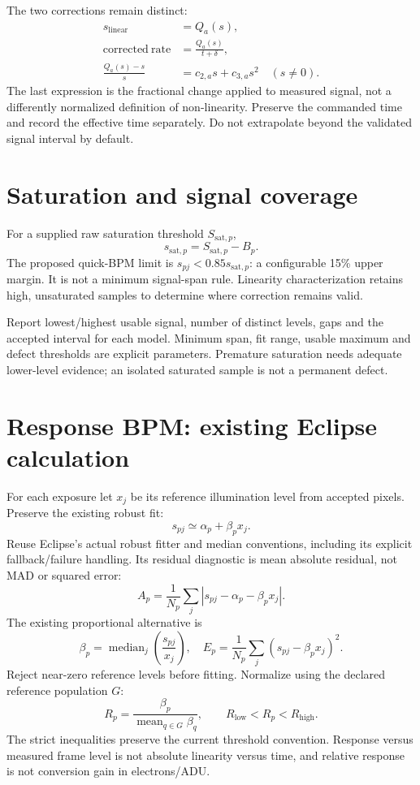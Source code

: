 \documentclass[11pt,a4paper]{article}
\newcommand{\nextpage}{\clearpage}
\begin{document}
The two corrections remain distinct:
\begin{align}
s_{\mathrm{linear}}&=Q_a(s),\\
\mathrm{corrected\ rate}&=\frac{Q_a(s)}{t+\delta},\\
\frac{Q_a(s)-s}{s}&=c_{2,a}s+c_{3,a}s^2\quad(s\ne0).
\end{align}
The last expression is the fractional change applied to measured signal, not a differently normalized definition of non-linearity. Preserve the commanded time and record the effective time separately. Do not extrapolate beyond the validated signal interval by default.

\section{Saturation and signal coverage}
For a supplied raw saturation threshold $S_{\mathrm{sat},p}$,
\begin{equation}s_{\mathrm{sat},p}=S_{\mathrm{sat},p}-B_p.
\end{equation}
The proposed quick-BPM limit is $s_{pj}<0.85s_{\mathrm{sat},p}$: a configurable 15\% upper margin. It is not a minimum signal-span rule. Linearity characterization retains high, unsaturated samples to determine where correction remains valid.

Report lowest/highest usable signal, number of distinct levels, gaps and the accepted interval for each model. Minimum span, fit range, usable maximum and defect thresholds are explicit parameters. Premature saturation needs adequate lower-level evidence; an isolated saturated sample is not a permanent defect.

\nextpage
\section{Response BPM: existing Eclipse calculation}
For each exposure let $x_j$ be its reference illumination level from accepted pixels. Preserve the existing robust fit:
\begin{equation}s_{pj}\simeq\alpha_p+\beta_px_j.
\end{equation}
Reuse Eclipse's actual robust fitter and median conventions, including its explicit fallback/failure handling. Its residual diagnostic is mean absolute residual, not MAD or squared error:
\begin{equation}A_p=\frac{1}{N_p}\sum_j|s_{pj}-\alpha_p-\beta_px_j|.
\end{equation}
The existing proportional alternative is
\begin{equation}\beta_p=\operatorname{median}_j\left(\frac{s_{pj}}{x_j}\right),\quad
E_p=\frac{1}{N_p}\sum_j(s_{pj}-\beta_px_j)^2.
\end{equation}
Reject near-zero reference levels before fitting. Normalize using the declared reference population $G$:
\begin{equation}R_p=\frac{\beta_p}{\operatorname{mean}_{q\in G}\beta_q},\qquad
R_{\mathrm{low}}<R_p<R_{\mathrm{high}}.
\end{equation}
The strict inequalities preserve the current threshold convention. Response versus measured frame level is not absolute linearity versus time, and relative response is not conversion gain in electrons/ADU.
\end{document}
